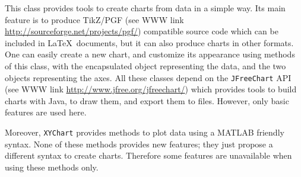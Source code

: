 
This class provides tools to create charts from data in a simple way. Its main
feature is to produce
 TikZ/PGF (see WWW link \url{http://sourceforge.net/projects/pgf/})
 compatible source code which can be included
in \LaTeX\ documents, but it can also produce charts in other formats.
One can easily create a new chart, and customize its appearance using methods
of this class, with the encapsulated
 object
representing the data, and the two
 objects representing the axes.
All these classes depend on the \texttt{JFreeChart} API (see WWW link
\url{http://www.jfree.org/jfreechart/}) which provides tools to build charts with
Java, to draw them, and export them to files. However, only basic features are
used here.

Moreover, \texttt{XYChart} provides methods to plot data using a MATLAB friendly
syntax. None of these methods provides new features; they just propose a
different syntax to create charts. Therefore some features are unavailable
when using these methods only.

